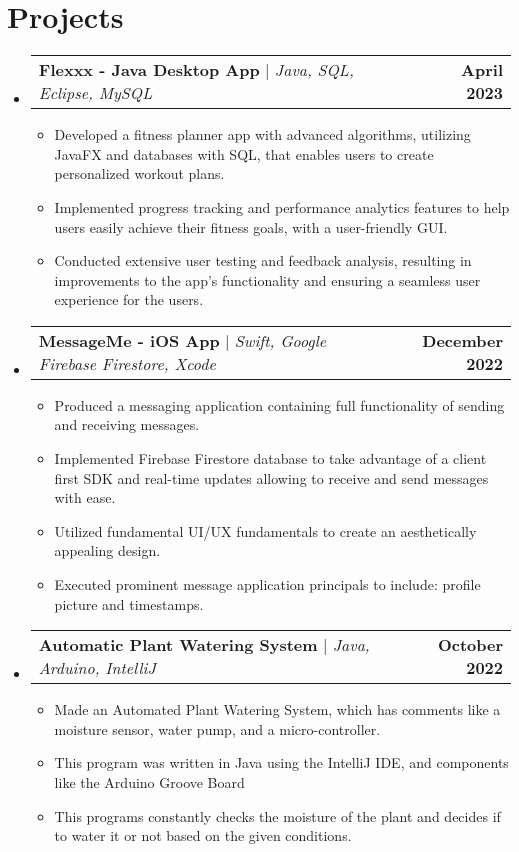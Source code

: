 \documentclass[letterpaper,11pt]{article}
\makeatletter
\newcommand{\resumeItem}[1]{
  \item\small{
    {#1 \vspace{-2pt}}
  }
}
\newcommand{\resumeProjectHeading}[2]{
    \item
    \begin{tabular*}{1.001\textwidth}{l@{\extracolsep{\fill}}r}
      \small#1 & \textbf{\small #2}\\
    \end{tabular*}\vspace{-7pt}
}
\newcommand{\resumeSubHeadingListStart}{\begin{itemize}[leftmargin=0.0in, label={}]}
\newcommand{\resumeSubHeadingListEnd}{\end{itemize}}
\newcommand{\resumeItemListStart}{\begin{itemize}}
\newcommand{\resumeItemListEnd}{\end{itemize}\vspace{-5pt}}
\makeatother
\begin{document}
\section{Projects}
    \vspace{-5pt}
    \resumeSubHeadingListStart
      \resumeProjectHeading
          {\textbf{Flexxx - Java Desktop App} $|$ \emph{Java, SQL, Eclipse, MySQL}}{April 2023}
          \resumeItemListStart
         \resumeItem{Developed a fitness planner app with advanced algorithms, utilizing JavaFX and databases with SQL, that enables users to create personalized workout plans.}
\resumeItem{Implemented progress tracking and performance analytics features to help users easily achieve their fitness goals, with a user-friendly GUI.}
\resumeItem{Conducted extensive user testing and feedback analysis, resulting in improvements to the app's functionality and ensuring a seamless user experience for the users.}
          \resumeItemListEnd 
          \vspace{-13pt}
           \resumeProjectHeading
          {\textbf{MessageMe - iOS App} $|$ \emph{Swift, Google Firebase Firestore, Xcode}}{December 2022}
          \resumeItemListStart
            \resumeItem{Produced a messaging application containing full functionality of sending and receiving messages.}
            \resumeItem{Implemented Firebase Firestore database to take advantage of a client first SDK and real-time updates allowing to receive and send messages with ease.}
            \resumeItem{Utilized fundamental UI/UX fundamentals to create an aesthetically appealing design. }
            \resumeItem{Executed prominent message application principals to include: profile picture and timestamps.}
          \resumeItemListEnd
          \vspace{-13pt}
          \resumeProjectHeading
          {\textbf{Automatic Plant Watering System} $|$ \emph{Java, Arduino, IntelliJ}}{October 2022}
          \resumeItemListStart
            \resumeItem{Made an Automated Plant Watering System, which has comments like a moisture sensor, water pump, and a micro-controller.}
            \resumeItem{This program was written in Java using the IntelliJ IDE, and components like the Arduino Groove Board}
            \resumeItem{This programs constantly checks the moisture of the plant and decides if to water it or not based on the given
conditions.}
          \resumeItemListEnd 
    \resumeSubHeadingListEnd
\vspace{-15pt}


%
\end{document}
